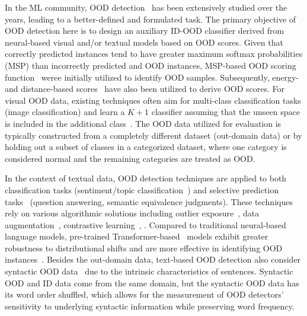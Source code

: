 In the ML community, OOD detection~\cite{hendrycksbaseline, yang2021generalized, salehiunified, li2023survey} has been extensively studied over the years, leading to a better-defined and formulated task. The primary objective of OOD detection here is to design an auxiliary ID-OOD classifier derived from neural-based visual and/or textual models based on OOD scores. Given that correctly predicted instances tend to have greater maximum softmax probabilities (MSP) than incorrectly predicted and OOD instances, MSP-based OOD scoring function~\cite{hendrycksbaseline, hein2019relu} weree initially utilized to identify OOD samples. Subsequently, energy- and distance-based scores~\cite{liu2020energy, zhou2021contrastive,sun2022knn} have also been utilized to derive OOD scores. For visual OOD data, existing techniques often aim for multi-class classification tasks (\eg image classification) and learn a $K+1$ classifier assuming that the unseen space is included in the additional class~\cite{hu2021outlier, liznerski2022exposing}. The OOD data utilized for evaluation is typically constructed from a completely different dataset (out-domain data) or by holding out a subset of classes in a categorized dataset, where one category is considered normal and the remaining categories are treated as OOD.

In the context of textual data, OOD detection techniques are applied to both classification tasks (\eg sentiment/topic classification~\cite{zhou2021contrastive, kim-etal-2023-pseudo}) and selective prediction tasks~\cite{kamath-etal-2020-selective,varshney-etal-2022-investigating, xin2021art} (\eg question answering, semantic equivalence judgments). These techniques rely on various algorithmic solutions including outlier exposure~\cite{zeng2021adversarial, hu2021outlier}, data augmentation~\cite{zheng2020aug, zhan-etal-2021-scope}, contrastive learning~\cite{zhou2021contrastive, 10.1109/TASLP.2022.3162081}, \etc. Compared to traditional neural-based language models, pre-trained Transformer-based~\cite{vaswani2017attention} models exhibit greater robustness to distributional shifts and are more effective in identifying OOD instances~\cite{hendrycks2020pretrained, xu-etal-2021-unsupervised}. Besides the out-domain data, text-based OOD detection also consider syntactic OOD data~\cite{mai2022self} due to the intrinsic characteristics of sentences. Syntactic OOD and ID data come from the same domain, but the syntactic OOD data has its word order shuffled, which allows for the measurement of OOD detectors' sensitivity to underlying syntactic information while preserving word frequency.


